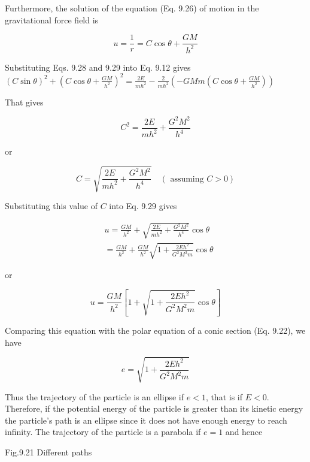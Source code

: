 \documentclass[10pt]{article}
\begin{document}
Furthermore, the solution of the equation (Eq. 9.26) of motion in the gravitational force field is


\begin{equation*}
u=\frac{1}{r}=C \cos \theta+\frac{G M}{h^{2}} \tag{9.29}
\end{equation*}


Substituting Eqs. 9.28 and 9.29 into Eq. 9.12 gives\\
$(C \sin \theta)^{2}+\left(C \cos \theta+\frac{G M}{h^{2}}\right)^{2}=\frac{2 E}{m h^{2}}-\frac{2}{m h^{2}}\left(-G M m\left(C \cos \theta+\frac{G M}{h^{2}}\right)\right)$

That gives

$$
C^{2}=\frac{2 E}{m h^{2}}+\frac{G^{2} M^{2}}{h^{4}}
$$

or

$$
C=\sqrt{\frac{2 E}{m h^{2}}+\frac{G^{2} M^{2}}{h^{4}}} \quad(\text { assuming } C>0)
$$

Substituting this value of $C$ into Eq. 9.29 gives

$$
\begin{aligned}
& u=\frac{G M}{h^{2}}+\sqrt{\frac{2 E}{m h^{2}}+\frac{G^{2} M^{2}}{h^{4}}} \cos \theta \\
& =\frac{G M}{h^{2}}+\frac{G M}{h^{2}} \sqrt{1+\frac{2 E h^{2}}{G^{2} M^{2} m}} \cos \theta
\end{aligned}
$$

or


\begin{equation*}
u=\frac{G M}{h^{2}}\left[1+\sqrt{1+\frac{2 E h^{2}}{G^{2} M^{2} m}} \cos \theta\right] \tag{9.30}
\end{equation*}


Comparing this equation with the polar equation of a conic section (Eq. 9.22), we have

$$
e=\sqrt{1+\frac{2 E h^{2}}{G^{2} M^{2} m}}
$$

Thus the trajectory of the particle is an ellipse if $e<1$, that is if $E<0$. Therefore, if the potential energy of the particle is greater than its kinetic energy the particle's path is an ellipse since it does not have enough energy to reach infinity. The trajectory of the particle is a parabola if $e=1$ and hence

Fig.9.21 Different paths
\end{document}
